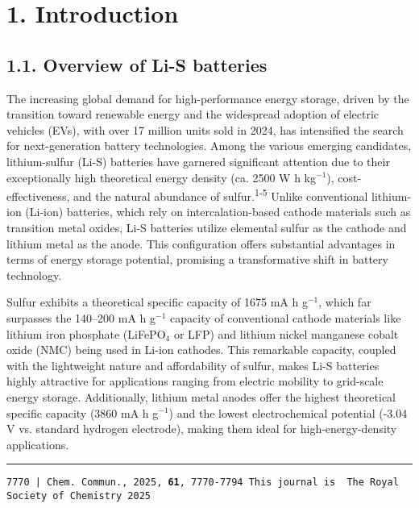 \documentclass[12pt,a4paper]{article}
\begin{document}
\begin{minipage}[t]{0.48\textwidth}
    \vspace{0pt} %
    
    \section*{1. Introduction}
    \subsection*{1.1. Overview of Li-S batteries}
    
    The increasing global demand for high-performance energy storage, driven by the transition toward renewable energy and the widespread adoption of electric vehicles (EVs), with over 17 million units sold in 2024, has intensified the search for next-generation battery technologies. Among the various emerging candidates, lithium-sulfur (Li-S) batteries have garnered significant attention due to their exceptionally high theoretical energy density (ca. 2500 W h kg$^{-1}$), cost-effectiveness, and the natural abundance of sulfur.\textsuperscript{1-5} Unlike conventional lithium-ion (Li-ion) batteries, which rely on intercalation-based cathode materials such as transition metal oxides, Li-S batteries utilize elemental sulfur as the cathode and lithium metal as the anode. This configuration offers substantial advantages in terms of energy storage potential, promising a transformative shift in battery technology.
    
    \vspace{0.5cm}
    
    Sulfur exhibits a theoretical specific capacity of 1675 mA h g$^{-1}$, which far surpasses the 140–200 mA h g$^{-1}$ capacity of conventional cathode materials like lithium iron phosphate (LiFePO$_{4}$ or LFP) and lithium nickel manganese cobalt oxide (NMC) being used in Li-ion cathodes. This remarkable capacity, coupled with the lightweight nature and affordability of sulfur, makes Li-S batteries highly attractive for applications ranging from electric mobility to grid-scale energy storage. Additionally, lithium metal anodes offer the highest theoretical specific capacity (3860 mA h g$^{-1}$) and the lowest electrochemical potential (-3.04 V vs. standard hydrogen electrode), making them ideal for high-energy-density applications.
\end{minipage}

\vspace{1cm}

\vfill
\hrule
\noindent
\texttt{\small 7770 | Chem. Commun., 2025, \textbf{61}, 7770-7794 \hfill This journal is \textcopyright\ The Royal Society of Chemistry 2025}
\end{document}
